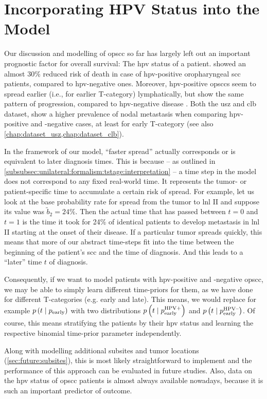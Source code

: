 \documentclass[\relativeRoot/main.tex]{subfiles}
\begin{document}
\section{Incorporating HPV Status into the Model}
\label{sec:future:hpv}

Our discussion and modelling of \gls{opscc} so far has largely left out an important prognostic factor for overall survival: The \gls{hpv} status of a patient.  showed an almost 30\% reduced risk of death in case of \gls{hpv}-positive oropharyngeal \gls{scc} patients, compared to \gls{hpv}-negative ones. Moreover, \gls{hpv}-positive \glspl{opscc} seem to spread earlier (i.e., for earlier T-category) lymphatically, but show the same pattern of progression, compared to \gls{hpv}-negative disease \cite{bauwens_prevalence_2021}. Both the \gls{usz} and \gls{clb} dataset, show a higher prevalence of nodal metastasis when comparing \gls{hpv}-positive and -negative cases, at least for early T-category \cite{ludwig_detailed_2021} (see also \cref{chap:dataset_usz,chap:dataset_clb}).

In the framework of our model, ``faster spread'' actually corresponds or is equivalent to later diagnosis times. This is because -- as outlined in \cref{subsubsec:unilateral:formalism:tstage:interpretation} -- a time step in the model does not correspond to any fixed real-world time. It represents the tumor- or patient-specific time to accumulate a certain risk of spread. For example, let us look at the base probability rate for spread from the tumor to \gls{lnl} II and suppose its value was $\tilde{b}_2 = 24\%$. Then the actual time that has passed between $t=0$ and $t=1$ is the time it took for 24\% of identical patients to develop metastasis in \gls{lnl} II starting at the onset of their disease. If a particular tumor spreads quickly, this means that more of our abstract time-steps fit into the time between the beginning of the patient's \gls{scc} and the time of diagnosis. And this leads to a ``later'' time $t$ of diagnosis.

Consequently, if we want to model patients with \gls{hpv}-positive and -negative \gls{opscc}, we may be able to simply learn different time-priors for them, as we have done for different T-categories (e.g. early and late). This means, we would replace for example $p \left( t \mid p_\text{early} \right)$ with two distributions $p \left( t \mid p_\text{early}^\text{HPV+} \right)$ and $p \left( t \mid p_\text{early}^\text{HPV--} \right)$. Of course, this means stratifying the patients by their \gls{hpv} status and learning the respective binomial time-prior parameter independently.

Along with modelling additional subsites and tumor locations (\cref{sec:future:subsites}), this is most likely straightforward to implement and the performance of this approach can be evaluated in future studies. Also, data on the \gls{hpv} status of \gls{opscc} patients is almost always available nowadays, because it is such an important predictor of outcome.
\end{document}
